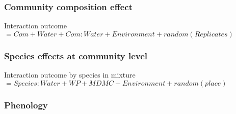 \documentclass[12pt]{article} %
\begin{document}
\subsubsection{Community composition effect}

Interaction outcome $= Com + Water + Com:Water + Environment + random(Replicates) $
\subsubsection{Species effects at community level}
Interaction outcome by species in mixture$ = Species:Water + WP + MDMC + Environment + random(place)$

\subsubsection{Phenology}




\begin{spacing}{1.0}

\end{spacing}
\end{document}
